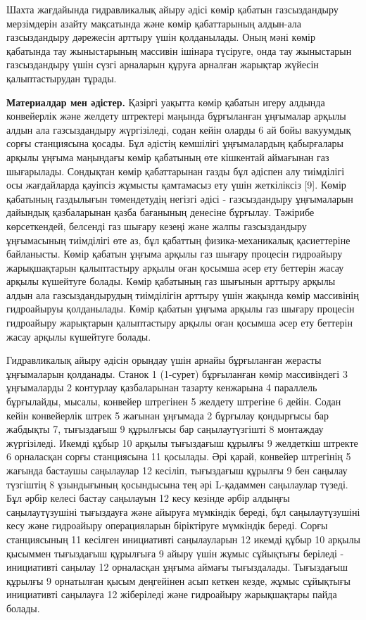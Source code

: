 Шахта жағдайында гидравликалық айыру әдісі көмір қабатын газсыздандыру
мерзімдерін азайту мақсатында және көмір қабаттарының алдын-ала
газсыздандыру дәрежесін арттыру үшін қолданылады. Оның мәні көмір
қабатында тау жыныстарының массивін ішінара түсіруге, онда тау
жыныстарын газсыздандыру үшін сүзгі арналарын құруға арналған жарықтар
жүйесін қалыптастырудан тұрады.

{\bfseries Материалдар мен әдістер.} Қазіргі уақытта көмір қабатын игеру
алдында конвейерлік және желдету штректері маңында бұрғыланған ұңғымалар
арқылы алдын ала газсыздандыру жүргізіледі, содан кейін оларды 6 ай бойы
вакуумдық сорғы станциясына қосады. Бұл әдістің кемшілігі ұңғымалардың
қабырғалары арқылы ұңғыма маңындағы көмір қабатының өте кішкентай
аймағынан газ шығарылады. Сондықтан көмір қабаттарынан газды бұл әдіспен
алу тиімділігі осы жағдайларда қауіпсіз жұмысты қамтамасыз ету үшін
жеткіліксіз {[}9{]}. Көмір қабатының газдылығын төмендетудің негізгі
әдісі - газсыздандыру ұңғымаларын дайындық қазбаларынан қазба бағанының
денесіне бұрғылау. Тәжірибе көрсеткендей, белсенді газ шығару кезеңі
және жалпы газсыздандыру ұңғымасының тиімділігі өте аз, бұл қабаттың
физика-механикалық қасиеттеріне байланысты. Көмір қабатын ұңғыма арқылы
газ шығару процесін гидроайыру жарықшақтарын қалыптастыру арқылы оған
қосымша әсер ету беттерін жасау арқылы күшейтуге болады. Көмір қабатының
газ шығынын арттыру арқылы алдын ала газсыздандырудың тиімділігін
арттыру үшін жақында көмір массивінің гидроайыруы қолданылады. Көмір
қабатын ұңғыма арқылы газ шығару процесін гидроайыру жарықтарын
қалыптастыру арқылы оған қосымша әсер ету беттерін жасау арқылы
күшейтуге болады.

Гидравликалық айыру әдісін орындау үшін арнайы бұрғыланған жерасты
ұңғымаларын қолданады. Станок 1 (1-сурет) бұрғыланған көмір массивіндегі
3 ұңғымаларды 2 контурлау қазбаларынан тазарту кенжарына 4 параллель
бұрғылайды, мысалы, конвейер штрегінен 5 желдету штрегіне 6 дейін. Содан
кейін конвейерлік штрек 5 жағынан ұңғымада 2 бұрғылау қондырғысы бар
жабдықты 7, тығыздағыш 9 құрылғысы бар саңылаутүзгішті 8 монтаждау
жүргізіледі. Икемді құбыр 10 арқылы тығыздағыш құрылғы 9 желдеткіш
штректе 6 орналасқан сорғы станциясына 11 қосылады. Әрі қарай, конвейер
штрегінің 5 жағында бастаушы саңылаулар 12 кесіліп, тығыздағыш құрылғы 9
бен саңылау түзгіштің 8 ұзындығының қосындысына тең әрі L-қадаммен
саңылаулар түзеді. Бұл әрбір келесі бастау саңылауын 12 кесу кезінде
әрбір алдыңғы саңылаутүзушіні тығыздауға және айыруға мүмкіндік береді,
бұл саңылаутүзушіні кесу және гидроайыру операцияларын біріктіруге
мүмкіндік береді. Сорғы станциясының 11 кесілген инициативті
саңылауларын 12 икемді құбыр 10 арқылы қысыммен тығыздағыш құрылғыға 9
айыру үшін жұмыс сұйықтығы беріледі - инициативті саңылау 12 орналасқан
ұңғыма аймағы тығыздалады. Тығыздағыш құрылғы 9 орнатылған қысым
деңгейінен асып кеткен кезде, жұмыс сұйықтығы инициативті саңылауға 12
жіберіледі және гидроайыру жарықшақтары пайда болады.

